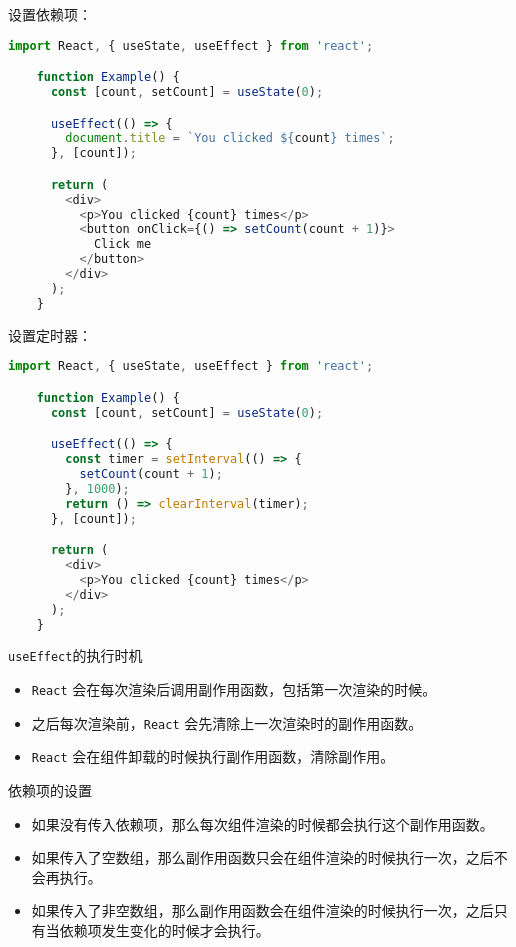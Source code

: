 \documentclass{beamer}
\begin{document}
\begin{frame}
  设置依赖项：

  \begin{lstlisting}[language=JavaScript]
    import React, { useState, useEffect } from 'react';

    function Example() {
      const [count, setCount] = useState(0);

      useEffect(() => {
        document.title = `You clicked ${count} times`;
      }, [count]);

      return (
        <div>
          <p>You clicked {count} times</p>
          <button onClick={() => setCount(count + 1)}>
            Click me
          </button>
        </div>
      );
    }
  \end{lstlisting}

  设置定时器：

  \begin{lstlisting}[language=JavaScript]
    import React, { useState, useEffect } from 'react';

    function Example() {
      const [count, setCount] = useState(0);

      useEffect(() => {
        const timer = setInterval(() => {
          setCount(count + 1);
        }, 1000);
        return () => clearInterval(timer);
      }, [count]);

      return (
        <div>
          <p>You clicked {count} times</p>
        </div>
      );
    }
  \end{lstlisting}

  \framebreak

  \begin{block}{\texttt{useEffect}的执行时机}
    \begin{itemize}
      \item \texttt{React} 会在每次渲染后调用副作用函数，包括第一次渲染的时候。
      \item 之后每次渲染前，\texttt{React} 会先清除上一次渲染时的副作用函数。
      \item \texttt{React} 会在组件卸载的时候执行副作用函数，清除副作用。
    \end{itemize}
  \end{block}

  \begin{alertblock}{依赖项的设置}
    \begin{itemize}
      \item 如果没有传入依赖项，那么每次组件渲染的时候都会执行这个副作用函数。
      \item 如果传入了空数组，那么副作用函数只会在组件渲染的时候执行一次，之后不会再执行。
      \item 如果传入了非空数组，那么副作用函数会在组件渲染的时候执行一次，之后只有当依赖项发生变化的时候才会执行。
    \end{itemize}
  \end{alertblock}


\end{frame}
\end{document}
